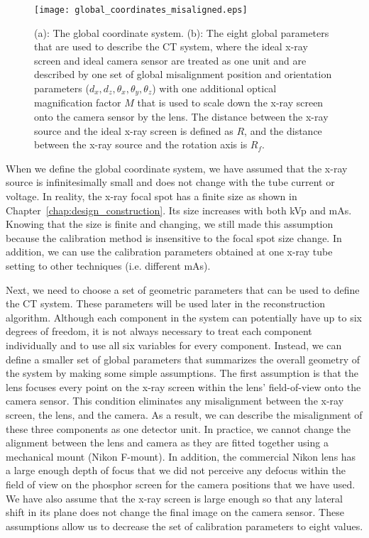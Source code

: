 \begin{figure}[ht]
\centering
\texttt{[image: global\_coordinates\_misaligned.eps]}
\caption{ (a): The global coordinate system.  (b): The eight global parameters that are used to describe the CT system, where the ideal x-ray screen and ideal camera sensor are treated as one unit and are described by one set of global misalignment position and orientation parameters ($d_x, d_z, \theta_x, \theta_y, \theta_z$) with one additional optical magnification factor $M$ that is used to scale down the x-ray screen onto the camera sensor by the lens.  The distance between the x-ray source and the ideal x-ray screen is defined as $R$, and the distance between the x-ray source and the rotation axis is $R_f$.}
\label{fig:global_coord_misaligned}
\end{figure}

When we define the global coordinate system, we have assumed that the x-ray source is infinitesimally small and does not change with the tube current or voltage.  In reality, the x-ray focal spot has a finite size as shown in Chapter~\ref{chap:design_construction}.  Its size increases with both kVp and mAs.  Knowing that the size is finite and changing, we still made this assumption because the calibration method is insensitive to the focal spot size change.  In addition, we can use the calibration parameters obtained at one x-ray tube setting to other techniques (i.e. different mAs). 

Next, we need to choose a set of geometric parameters that can be used to define the CT system.  These parameters will be used later in the reconstruction algorithm.  Although each component in the system can potentially have up to six degrees of freedom, it is not always necessary to treat each component individually and to use all six variables for every component.  Instead, we can define a smaller set of global parameters that summarizes the overall geometry of the system by making some simple assumptions.  The first assumption is that the lens focuses every point on the x-ray screen within the lens' field-of-view onto the camera sensor.  This condition eliminates any misalignment between the x-ray screen, the lens, and the camera.  As a result, we can describe the misalignment of these three components as one detector unit.  In practice, we cannot change the alignment between the lens and camera as they are fitted together using a mechanical mount (Nikon F-mount).  In addition, the commercial Nikon lens has a large enough depth of focus that we did not perceive any defocus within the field of view on the phosphor screen for the camera positions that we have used.  We have also assume that the x-ray screen is large enough so that any lateral shift in its plane does not change the final image on the camera sensor.  These assumptions allow us to decrease the set of calibration parameters to eight values.

